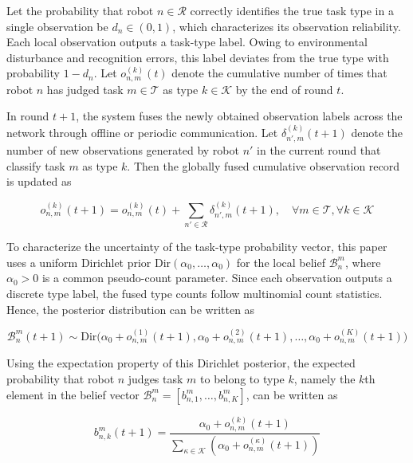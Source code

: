 \documentclass[journal,twoside,web]{ieeecolor}
\begin{document}
Let the probability that robot $n \in \mathcal{R}$ correctly identifies the true task type in a single observation be $d_n \in (0,1)$, which characterizes its observation reliability. Each local observation outputs a task-type label. Owing to environmental disturbance and recognition errors, this label deviates from the true type with probability $1-d_n$. Let $o_{n,m}^{(k)}(t)$ denote the cumulative number of times that robot $n$ has judged task $m \in \mathcal{T}$ as type $k \in \mathcal{K}$ by the end of round $t$.

In round $t+1$, the system fuses the newly obtained observation labels across the network through offline or periodic communication. Let $\delta_{n',m}^{(k)}(t+1)$ denote the number of new observations generated by robot $n'$ in the current round that classify task $m$ as type $k$. Then the globally fused cumulative observation record is updated as

\begin{equation}
    o_{n,m}^{(k)}(t+1) = o_{n,m}^{(k)}(t) + \sum_{n' \in \mathcal{R}} \delta_{n',m}^{(k)}(t+1), \quad \forall m \in \mathcal{T}, \forall k \in \mathcal{K}
\label{eq:observation_update}
\end{equation}

To characterize the uncertainty of the task-type probability vector, this paper uses a uniform Dirichlet prior $\text{Dir}(\alpha_0,\ldots,\alpha_0)$ for the local belief $\mathcal{B}_n^m$, where $\alpha_0 > 0$ is a common pseudo-count parameter. Since each observation outputs a discrete type label, the fused type counts follow multinomial count statistics. Hence, the posterior distribution can be written as

\begin{equation}
    \mathcal{B}_n^m(t+1) \sim \text{Dir} \Big( \alpha_0 + o_{n,m}^{(1)}(t+1), \alpha_0 + o_{n,m}^{(2)}(t+1), \dots, \alpha_0 + o_{n,m}^{(K)}(t+1) \Big)
\label{eq:dirichlet_update}
\end{equation}

Using the expectation property of this Dirichlet posterior, the expected probability that robot $n$ judges task $m$ to belong to type $k$, namely the $k$th element in the belief vector $\mathcal{B}_{n}^m = [b_{n,1}^m, \dots, b_{n,K}^m]$, can be written as

\begin{equation}
    b_{n,k}^m(t+1) = \frac{\alpha_0 + o_{n,m}^{(k)}(t+1)}{\sum_{\kappa \in \mathcal{K}} \left( \alpha_0 + o_{n,m}^{(\kappa)}(t+1) \right)}
\label{eq:belief_expectation}
\end{equation}
\end{document}
